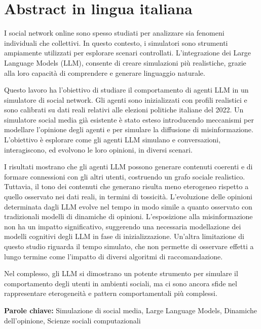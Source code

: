 \section*{Abstract in lingua italiana}
I social network online sono spesso studiati per analizzare sia fenomeni individuali che collettivi. 
In questo contesto, i simulatori sono strumenti ampiamente utilizzati per esplorare scenari controllati.
L’integrazione dei Large Language Models (LLM), consente di creare simulazioni più realistiche, grazie alla loro capacità di comprendere e generare linguaggio naturale.

Questo lavoro ha l’obiettivo di studiare il comportamento di agenti LLM in un simulatore di social network.
Gli agenti sono inizializzati con profili realistici e sono calibrati su dati reali relativi alle elezioni politiche italiane del 2022.
Un simulatore social media già esistente è stato esteso introducendo meccanismi per modellare l’opinione degli agenti e per simulare la diffusione di misinformazione.
L’obiettivo è esplorare come gli agenti LLM simulano e conversazioni, interagiscono, ed evolvono le loro opinioni, in diversi scenari.

I risultati mostrano che gli agenti LLM possono generare contenuti coerenti e di formare connessioni con gli altri utenti, costruendo un grafo sociale realistico.
Tuttavia, il tono dei contenuti che generano risulta meno eterogeneo rispetto a quello osservato nei dati reali, in termini di tossicità.
L’evoluzione delle opinioni determinata dagli LLM evolve nel tempo in modo simile a quanto osservato con tradizionali modelli di dinamiche di opinioni.
L'esposizione alla misinformazione non ha un impatto significativo, suggerendo una necessaria modellazione dei modelli cognitivi degli LLM in fase di inizializzazione.
Un'altra limitazione di questo studio riguarda il tempo simulato, che non permette di osservare effetti a lungo termine come l'impatto di diversi algoritmi di raccomandazione.

Nel complesso, gli LLM si dimostrano un potente strumento per simulare il comportamento degli utenti in ambienti sociali, ma ci sono ancora sfide nel rappresentare eterogeneità e pattern comportamentali più complessi.


\vspace{15pt}
\begin{tcolorbox}[arc=0pt, boxrule=0pt, colback=bluePoli!60, width=\textwidth, colupper=white]
    \textbf{Parole chiave:} Simulazione di social media, Large Language Models, Dinamiche dell'opinione, Scienze sociali computazionali
\end{tcolorbox}